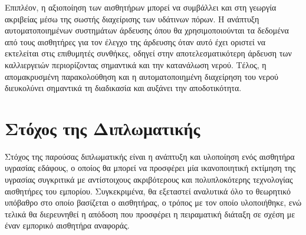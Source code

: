  \par Επιπλέον, η αξιοποίηση των αισθητήρων μπορεί να συμβάλλει και στη γεωργία ακριβείας μέσω 
της σωστής διαχείρισης των υδάτινων πόρων. Η ανάπτυξη αυτοματοποιημένων συστημάτων άρδευσης
όπου θα χρησιμοποιούνται τα δεδομένα από τους αισθητήρες για τον έλεγχο της άρδευσης
όταν αυτό έχει οριστεί να εκτελείται στις επιθυμητές συνθήκες, οδηγεί στην αποτελεσματικότερη άρδευση των καλλιεργειών 
περιορίζοντας σημαντικά και την κατανάλωση νερού. Τέλος, η απομακρυσμένη παρακολούθηση και η 
αυτοματοποιημένη διαχείρηση του νερού διευκολύνει σημαντικά τη διαδικασία και αυξάνει την 
αποδοτικότητα.

\section{Στόχος της Διπλωματικής}
Στόχος της παρούσας διπλωματικής είναι η ανάπτυξη και υλοποίηση ενός αισθητήρα υγρασίας εδάφους, ο οποίος θα μπορεί να προσφέρει μία ικανοποιητική
εκτίμηση της υγρασίας συγκριτικά με αντίστοιχους ακριβότερους και πολυπλοκότερης τεχνολογίας αισθητήρες του εμπορίου. Συγκεκριμένα, θα εξεταστεί αναλυτικά
όλο το θεωρητικό υπόβαθρο στο οποίο βασίζεται ο αισθητήρας, ο τρόπος με τον οποίο υλοποιήθηκε, ενώ τελικά θα διερευνηθεί η απόδοση που προσφέρει η
πειραματική διάταξη σε σχέση με έναν εμπορικό αισθητήρα αναφοράς. 

